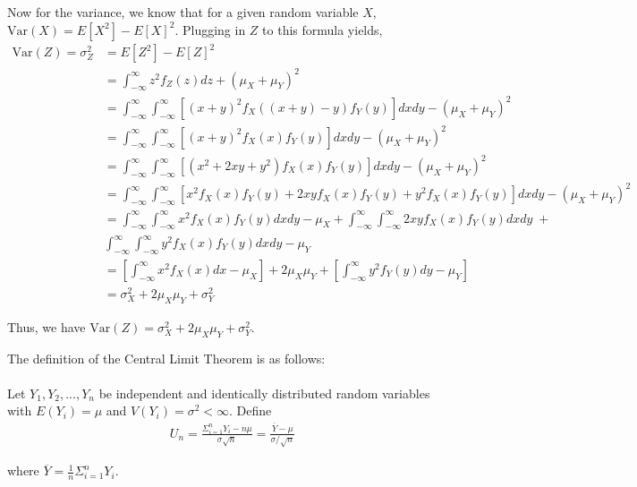 \documentclass[12pt]{article}
\newenvironment{problem}[2][Problem]{\begin{trivlist}
\item[\hskip \labelsep {\bfseries #1}\hskip \labelsep {\bfseries #2.}]}{\end{trivlist}}
\begin{document}
Now for the variance, we know that for a given random variable $X$, $\text{Var}(X) = E[X^2] - E[X]^2$. Plugging in $Z$ to this formula yields,
\begin{align*}
\text{Var}(Z) = \sigma_Z^2 &= E[Z^2] - E[Z]^2\\
&= \int_{-\infty}^{\infty} z^2f_Z(z) dz + (\mu_X + \mu_Y)^2\\
&= \int_{-\infty}^{\infty} \int_{-\infty}^{\infty} \left[(x+y)^2f_X((x+y)-y)f_Y(y)\right] dxdy - (\mu_X + \mu_Y)^2\\
&= \int_{-\infty}^{\infty} \int_{-\infty}^{\infty} \left[(x+y)^2f_X(x)f_Y(y)\right] dxdy - (\mu_X + \mu_Y)^2\\
&= \int_{-\infty}^{\infty} \int_{-\infty}^{\infty} \left[(x^2 + 2xy + y^2)f_X(x)f_Y(y)\right] dxdy - (\mu_X + \mu_Y)^2\\
&= \int_{-\infty}^{\infty} \int_{-\infty}^{\infty} \left[x^2f_X(x)f_Y(y) + 2xyf_X(x)f_Y(y) + y^2f_X(x)f_Y(y)\right] dxdy - (\mu_X + \mu_Y)^2\\
&= \int_{-\infty}^{\infty} \int_{-\infty}^{\infty} x^2f_X(x)f_Y(y) dxdy - \mu_X + \int_{-\infty}^{\infty} \int_{-\infty}^{\infty} 2xyf_X(x)f_Y(y) dxdy\; + \\&\int_{-\infty}^{\infty} \int_{-\infty}^{\infty} y^2f_X(x)f_Y(y) dxdy - \mu_Y\\
&= \left[\int_{-\infty}^{\infty} x^2f_X(x)dx - \mu_X\right] + 2\mu_X\mu_Y + \left[\int_{-\infty}^{\infty} y^2f_Y(y)dy - \mu_Y\right]\\
&= \sigma_X^2 + 2\mu_X\mu_Y + \sigma_Y^2
\end{align*}

Thus, we have $\text{Var}(Z) = \sigma_X^2 + 2\mu_X\mu_Y + \sigma_Y^2$.

\begin{problem}{7}
\end{problem}

\noindent The definition of the Central Limit Theorem is as follows:\\
\\
Let $Y_1, Y_2, ..., Y_n$ be independent and identically distributed random variables with $E(Y_i) = \mu$ and $V(Y_i) = \sigma^2 < \infty$. Define
\begin{align*}
U_n = \frac{\Sigma_{i=1}^n Y_i - n\mu}{\sigma\sqrt{n}} = \frac{\overline{Y} - \mu}{\sigma/\sqrt{n}}
\end{align*}

\noindent where $\overline{Y} = \frac{1}{n} \Sigma_{i=1}^n Y_i$.\\
\end{document}
